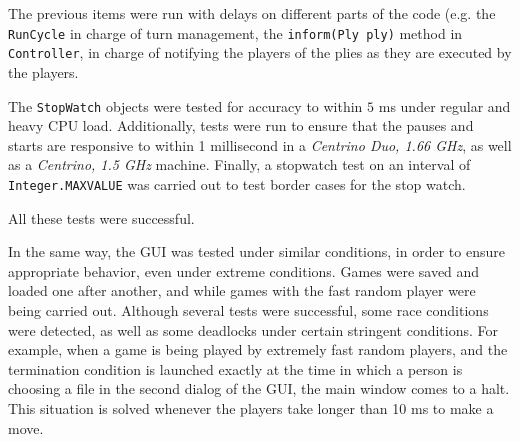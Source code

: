 		The previous items were run with delays on different parts of the code (e.g. the \texttt{RunCycle} 
		in charge of turn management, the \texttt{inform(Ply ply)} method in \texttt{Controller}, in charge
		of notifying the players of the plies as they are executed by the players. 
		
		The \texttt{StopWatch} objects were tested for accuracy to within $5$ ms under regular and heavy 
		CPU load. Additionally, tests were run to ensure that the pauses and starts are responsive to within 
		1 millisecond in a \emph{Centrino Duo, 1.66 GHz}, as well as a \emph{Centrino, 1.5 GHz} machine. 
		Finally, a stopwatch test on an interval of \texttt{Integer.MAXVALUE} was carried out to test 
		border cases for the stop watch. 
		
		All these tests were successful. 
		
		In the same way, the GUI was tested under similar conditions, in order to ensure appropriate behavior, 
		even under extreme conditions. Games were saved and loaded one after another, and while games with the
		fast random player were being carried out. Although several tests were successful, some race conditions
		were detected, as well as some deadlocks under certain stringent conditions. For example, when a game is
		being played by extremely fast random players, and the termination condition is launched exactly at the time
		in which a person is choosing a file in the second dialog of the GUI, the main window comes to a halt. 
		This situation is solved whenever the players take longer than 10 ms to make a move. 
		
		